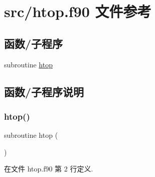 \hypertarget{htop_8f90}{}\section{src/htop.f90 文件参考}
\label{htop_8f90}
\subsection*{函数/子程序}
\begin{DoxyCompactItemize}
\item 
subroutine \mbox{\hyperlink{htop_8f90_a6f52b189057b77504ea54a3364c702f4}{htop}}
\end{DoxyCompactItemize}


\subsection{函数/子程序说明}
\mbox{\label{htop_8f90_a6f52b189057b77504ea54a3364c702f4}} 
\subsubsection{\texorpdfstring{htop()}{htop()}}
{\footnotesize\ttfamily subroutine htop (\begin{DoxyParamCaption}{ }\end{DoxyParamCaption})}



在文件 htop.\+f90 第 2 行定义.

